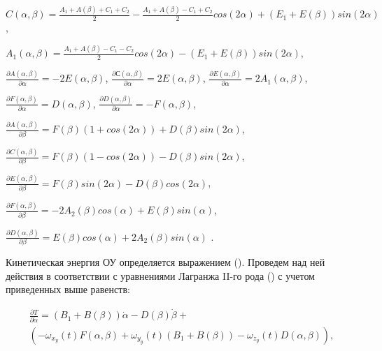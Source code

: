 \( C \left( \alpha, \beta \right) =\frac{A_{1}+A \left( \beta \right) +C_{1}+C_{2}}{2}-\frac{A_{1}+A \left( \beta \right) -C_{1}+C_{2}}{2}cos \left( 2 \alpha \right) + \left( E_{1}+E \left( \beta \right) \right) sin \left( 2 \alpha \right) \), 

\( A_{1} \left( \alpha, \beta \right) =\frac{A_{1}+A \left( \beta \right) -C_{1}-C_{2}}{2}cos \left( 2 \alpha \right) - \left( E_{1}+E \left( \beta \right) \right) sin \left( 2 \alpha \right) \), 

\( \frac{ \partial A \left( \alpha, \beta \right) }{ \partial \alpha }=-2E \left( \alpha, \beta \right) \), \( \frac{ \partial С \left( \alpha, \beta \right) }{ \partial \alpha }=2E \left( \alpha, \beta \right) \), \( \frac{ \partial E \left( \alpha, \beta \right) }{ \partial \alpha }=2A_{1} \left( \alpha, \beta \right) \), 

\( \frac{ \partial F \left( \alpha, \beta \right) }{ \partial \alpha }=D \left( \alpha, \beta \right) \), \( \frac{ \partial D \left( \alpha, \beta \right) }{ \partial \alpha }=-F \left( \alpha, \beta \right) \), 

\( \frac{ \partial A \left( \alpha, \beta \right) }{ \partial \beta }=F \left( \beta \right) \left( 1+cos \left( 2 \alpha \right) \right) +D \left( \beta \right) sin \left( 2 \alpha \right) \), 

\( \frac{ \partial C \left( \alpha, \beta \right) }{ \partial \beta }=F \left( \beta \right) \left( 1-cos \left( 2 \alpha \right) \right) -D \left( \beta \right) sin \left( 2 \alpha \right) \), 

\( \frac{ \partial E \left( \alpha, \beta \right) }{ \partial \beta }=F \left( \beta \right) sin \left( 2 \alpha \right) -D \left( \beta \right) cos \left( 2 \alpha \right) \), 

\( \frac{ \partial F \left( \alpha, \beta \right) }{ \partial \beta }=-2A_{2} \left( \beta \right) cos \left( \alpha \right) +E \left( \beta \right) sin \left( \alpha \right) \), 

\( \frac{ \partial D \left( \alpha, \beta \right) }{ \partial \beta }=E \left( \beta \right) cos \left( \alpha \right) +2A_{2} \left( \beta \right) sin \left( \alpha \right) \) . 

Кинетическая энергия ОУ определяется выражением (). Проведем над ней действия в соответствии с уравнениями Лагранжа II-го рода () с учетом приведенных выше равенств: 

\begin{equation}%
\label{eq:p3:42}
\begin{multlined}
\frac{ \partial T}{ \partial \dot \alpha}= 
(B_1 + B(\beta)) \dot{\alpha} - 
 D(\beta) \dot{\beta} + \\
(
	-\omega_{x_y} (t) F(\alpha, \beta)
	+\omega_{y_y} (t) (B_1 + B(\beta))
	-\omega_{z_y} (t) D(\alpha, \beta)
),
\end{multlined}
\end{equation}

